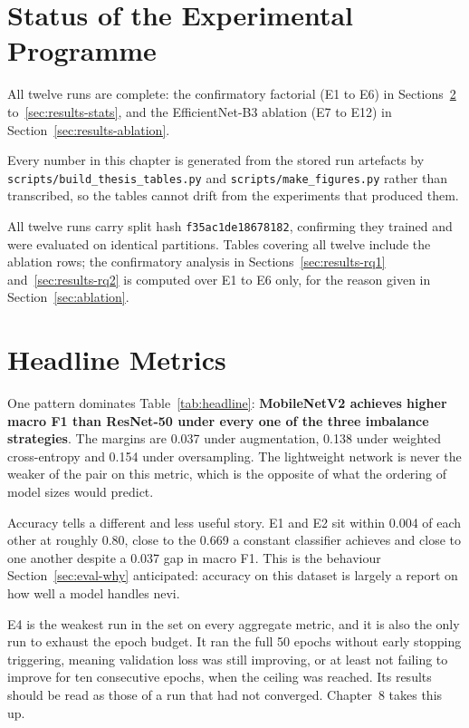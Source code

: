\section{Status of the Experimental Programme}
\label{sec:results-status}

All twelve runs are complete: the confirmatory factorial (E1 to E6) in
Sections~\ref{sec:results-headline} to~\ref{sec:results-stats}, and the EfficientNet-B3
ablation (E7 to E12) in Section~\ref{sec:results-ablation}.

Every number in this chapter is generated from the stored run artefacts by
\texttt{scripts/build\_thesis\_tables.py} and \texttt{scripts/make\_figures.py} rather
than transcribed, so the tables cannot drift from the experiments that produced them.

All twelve runs carry split hash \texttt{f35ac1de18678182}, confirming they trained and
were evaluated on identical partitions. Tables covering all twelve include the ablation
rows; the confirmatory analysis in Sections~\ref{sec:results-rq1}
and~\ref{sec:results-rq2} is computed over E1 to E6 only, for the reason given in
Section~\ref{sec:ablation}.

\section{Headline Metrics}
\label{sec:results-headline}



One pattern dominates Table~\ref{tab:headline}: \textbf{MobileNetV2 achieves higher macro
F1 than ResNet-50 under every one of the three imbalance strategies}. The margins are
0.037 under augmentation, 0.138 under weighted cross-entropy and 0.154 under
oversampling. The lightweight network is never the weaker of the pair on this metric,
which is the opposite of what the ordering of model sizes would predict.

Accuracy tells a different and less useful story. E1 and E2 sit within 0.004 of each
other at roughly 0.80, close to the 0.669 a constant classifier achieves and close to
one another despite a 0.037 gap in macro F1. This is the behaviour
Section~\ref{sec:eval-why} anticipated: accuracy on this dataset is largely a report on
how well a model handles nevi.

E4 is the weakest run in the set on every aggregate metric, and it is also the only run
to exhaust the epoch budget. It ran the full 50 epochs without early stopping
triggering, meaning validation loss was still improving, or at least not failing to
improve for ten consecutive epochs, when the ceiling was reached. Its results should be
read as those of a run that had not converged. Chapter~8 takes this up.

